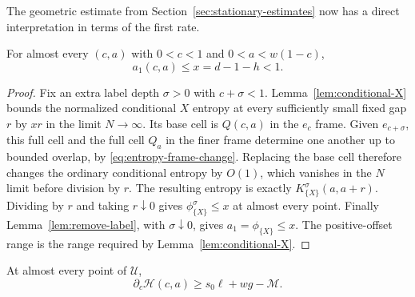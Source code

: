 The geometric estimate from Section~\ref{sec:stationary-estimates} now
has a direct interpretation in terms of the first rate.

\begin{corollary}\label{cor:normal-position-rate}
For almost every $(c,a)$ with $0<c<1$ and $0<a<w(1-c)$,
\begin{equation}
 a_1(c,a)\le x=d-1-h<1.
 \label{eq:entropy-normal-position-rate}
\end{equation}
\end{corollary}

\begin{proof}
Fix an extra label depth $\sigma>0$ with $c+\sigma<1$.
Lemma~\ref{lem:conditional-X} bounds the normalized conditional
$X$ entropy at every sufficiently small fixed gap $r$ by $xr$ in the
limit $N\to\infty$.  Its base cell is $Q(c,a)$ in the $e_c$ frame.
Given $e_{c+\sigma}$, this full cell and the full cell $Q_a$ in the
finer frame determine one another up to bounded overlap, by
\eqref{eq:entropy-frame-change}.  Replacing the base cell therefore
changes the ordinary conditional entropy by $O(1)$, which vanishes in
the $N$ limit before division by $r$.  The resulting entropy is exactly
$K_{\{X\}}^\sigma(a,a+r)$.  Dividing by $r$ and taking
$r\downarrow0$ gives $\phi_{\{X\}}^\sigma\le x$ at almost every
point.  Finally Lemma~\ref{lem:remove-label}, with
$\sigma\downarrow0$, gives $a_1=\phi_{\{X\}}\le x$.
The positive-offset range is the range required by
Lemma~\ref{lem:conditional-X}.
\end{proof}

\begin{proposition}
\label{prop:entropy-demand}
At almost every point of $\mathcal U$,
\begin{equation}
 \partial_c\mathscr H(c,a)\ge s_0\ell+wg-\mathcal M.
 \label{eq:entropy-demand}
\end{equation}
\end{proposition}

